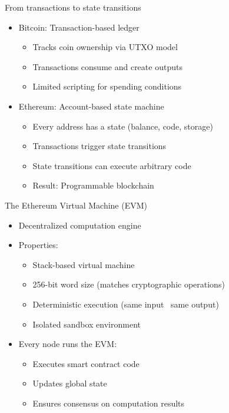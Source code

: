 \documentclass[aspectratio=169, lualatex, handout]{beamer}
\begin{document}
\begin{frame}{From transactions to state transitions}
	\begin{itemize}
		\item Bitcoin: Transaction-based ledger
		      \begin{itemize}
			      \item Tracks coin ownership via UTXO model
			      \item Transactions consume and create outputs
			      \item Limited scripting for spending conditions
		      \end{itemize}
		\item Ethereum: Account-based state machine
		      \begin{itemize}
			      \item Every address has a state (balance, code, storage)
			      \item Transactions trigger state transitions
			      \item State transitions can execute arbitrary code
			      \item Result: Programmable blockchain
		      \end{itemize}
	\end{itemize}
\end{frame}

\begin{frame}{The Ethereum Virtual Machine (EVM)}
	\begin{itemize}
		\item Decentralized computation engine
		\item Properties:
		      \begin{itemize}
			      \item Stack-based virtual machine
			      \item 256-bit word size (matches cryptographic operations)
			      \item Deterministic execution (same input \rightarrow\ same output)
			      \item Isolated sandbox environment
		      \end{itemize}
		\item Every node runs the EVM:
		      \begin{itemize}
			      \item Executes smart contract code
			      \item Updates global state
			      \item Ensures consensus on computation results
		      \end{itemize}
	\end{itemize}
\end{frame}
\end{document}
